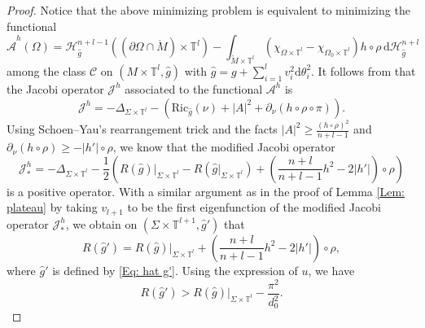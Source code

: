 \documentclass[11pt,letterpaper]{amsart}
\numberwithin{equation}{section}
\theoremstyle{definition}
\begin{document}
\begin{proof}
{Notice that the above minimizing problem is equivalent to minimizing the functional
$$\hat{\mathcal A}^h(\Omega)=\mathcal H_{\hat g}^{n+l-1}((\partial\Omega\cap \mathring M)\times \mathbb T^l)-\int_{\mathring M\times\mathbb T^l}(\chi_{\Omega\times \mathbb T^l}-\chi_{\Omega_0\times \mathbb T^l})h\circ \rho\,\mathrm d\mathcal H^{n+l}_{\hat g}$$
among the class $\mathcal C$ on $(M\times \mathbb T^l,\hat g)$ with $\hat g=g+\sum_{i=1}^l v_i^2\mathrm d\theta_i^2$. It follows from \cite[(1.3)]{ZZ20} that the Jacobi operator $\mathcal J^h$ associated to the functional $\mathcal A^h$ is
$$\mathcal J^h=-\Delta_{\Sigma\times \mathbb T^l}-(\mathrm{Ric}_{\hat g}(\nu)+|A|^2+\partial_\nu(h\circ \rho\circ\pi)).$$
Using Schoen--Yau's rearrangement trick and the facts $|A|^2\geq \frac{(h\circ\rho)^2}{n+l-1}$ and $\partial_\nu(h\circ \rho)\geq -|h'|\circ\rho$, we know that the modified Jacobi operator
$$\mathcal J^h_*=-\Delta_{\Sigma\times \mathbb T^l}- \frac{1}{2}\left(R(\hat g)|_{\Sigma\times \mathbb T^l} - R(\hat{g}|_{\Sigma\times \mathbb T^l})+\left(\frac{n+l}{n+l-1}h^2-2|h'|\right)\circ \rho\right)$$
is a positive operator.}
 With a similar argument as in the proof of Lemma \ref{Lem: plateau} by taking $v_{l+1}$ to be the first eigenfunction of the modified Jacobi operator $\mathcal J^h_*$, we obtain on $(\Sigma \times \mathbb T^{l+1}, \hat g')$ that
 \begin{equation}\label{Eq: scalar change}
     R(\hat g')= R(\hat g)|_{\Sigma\times \mathbb T^l}+\left(\frac{n+l}{n+l-1}h^2-2|h'|\right)\circ \rho,
 \end{equation}
where $\hat g'$ is defined by \eqref{Eq: hat g'}. {Using the expression of $u$, we have
$$ R(\hat g')> R(\hat g)|_{\Sigma\times \mathbb T^l}-\frac{\pi^2}{d_0^2}.$$}
\end{proof}
\end{document}
